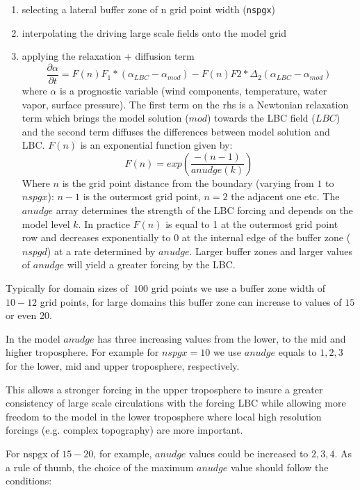 \begin{enumerate}
\item selecting a lateral buffer zone of n grid point width (\verb=nspgx=)
\item interpolating the driving large scale fields onto the model grid
\item applying the relaxation + diffusion term
\begin{equation}
\frac{\partial \alpha}{\partial t} = F(n)F_1 * (\alpha_{LBC}-\alpha_{mod}) -
    F(n)F2 * \Delta_2(\alpha_{LBC}-\alpha_{mod})
\end{equation}
where $\alpha$ is a prognostic variable (wind components, temperature, water
vapor, surface pressure). The first term on the rhs is a Newtonian relaxation
term which brings the model solution ($mod$) towards the LBC field ($LBC$)
and the second term diffuses the differences between model solution and LBC.
$F(n)$ is an exponential function given by:
\begin{equation}
F(n) = exp\left(\frac{-(n-1)}{anudge(k)}\right)
\end{equation}
Where $n$ is the grid point distance from the boundary (varying from $1$ to
$nspgx$): $n-1$ is the outermost grid point, $n=2$ the adjacent one etc.
The $anudge$ array determines the strength of the LBC forcing and depends on
the model level $k$. In practice $F(n)$ is equal to 1 at the outermost grid
point row and decreases exponentially to $0$ at the internal edge of the buffer
zone ($nspgd$) at a rate determined by $anudge$. Larger buffer zones and larger
values of $anudge$ will yield a greater forcing by the LBC.  
\end{enumerate}

Typically for domain sizes of $~100$ grid points we use a buffer zone width
of $10-12$ grid points, for large domains this buffer zone can increase to
values of $15$ or even $20$.

In the model $anudge$ has three increasing values from the lower, to the mid
and higher troposphere. For example for $nspgx = 10$ we use $anudge$ equals to
$1, 2, 3$ for the lower, mid and upper troposphere, respectively.

This allows a stronger forcing in the upper troposphere to insure a greater
consistency of large scale circulations with the forcing LBC while allowing
more freedom to the model in the lower troposphere where local high resolution
forcings (e.g. complex topography) are more important.

For nspgx of $15-20$, for example, $anudge$ values could be increased to
$2,3,4$. As a rule of thumb, the choice of the maximum $anudge$ value should
follow the conditions:

